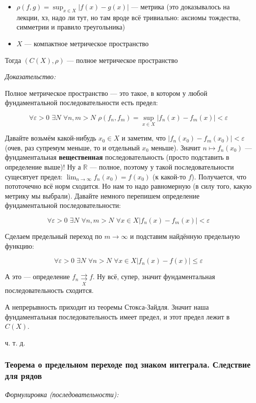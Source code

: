 \documentclass{article}
\def\dbl{\,\,}
\def\rsh#1{\underset{#1}{\rightrightarrows}}
\begin{document}
\begin{itemize}
    \item $\rho(f, g) = \sup_{x \in X} |f(x) - g(x)|$ --- метрика (это доказывалось на лекции, хз, надо ли тут, но там вроде всё тривиально: аксиомы тождества, симметрии и правило треугольника) 
    \item $X$ --- компактное метрическое пространство
\end{itemize}

Тогда $\left(C(X), \rho \right)$ --- полное метрическое пространство

\textit{Доказательство:}

Полное метрическое пространство --- это такое, в котором у любой фундаментальной последовательности есть предел:

\[\forall \varepsilon > 0 \dbl \exists N \dbl \forall n, m > N \dbl \rho(f_n, f_m) = \sup_{x \in X}|f_n(x) - f_m(x)| < \varepsilon\]

Давайте возьмём какой-нибудь $x_0 \in X$ и заметим, что $|f_n(x_0) - f_m(x_0)| < \varepsilon$ (очев, раз супремум меньше, то и отдельный $x_0$ меньше). Значит $n \mapsto f_n(x_0)$ --- фундаментальная \textbf{вещественная} последовательность (просто подставить в определение выше)! Ну а $\mathbb{R}$ --- полное, поэтому у такой последовательности сущесвтует предел: $\lim_{n \rightarrow \infty} f_n(x_0) = f(x_0)$ (к какой-то $f$). Получается, что пототочечно всё норм сходится. Но нам то надо равномерную (в силу того, какую метрику мы выбрали). Давайте немного перепишем определение фундаментальной последовательности:

\[\forall \varepsilon > 0 \dbl \exists N \dbl \forall n, m > N \dbl \forall x \in X |f_n(x) - f_m(x)| < \varepsilon\]

Сделаем предельный переход по $m \rightarrow \infty$ и подставим найдённую предельную функцию: 

\[\forall \varepsilon > 0 \dbl \exists N \dbl \forall n > N \dbl \forall x \in X |f_n(x) - f(x)| \le \varepsilon\]

А это --- определение $f_n \rsh{X} f$. Ну всё, супер, значит фундаментальная последовательность сходится.

А непрерывность приходит из теоремы Стокса-Зайдля. Значит наша фундаментальная последовательность имеет предел, и этот предел лежит в $C(X)$.

ч. т. д. 

\subsubsection{Теорема о предельном переходе под знаком интеграла. Следствие для рядов}
\textit{Формулировка (последовательности):}
\end{document}
